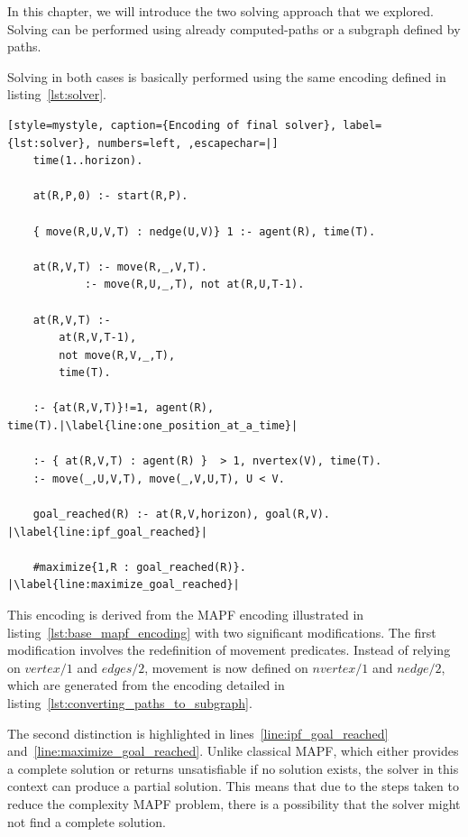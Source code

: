 In this chapter, we will introduce the two solving approach that we explored. Solving can be performed using already computed-paths or a subgraph defined by paths.

Solving in both cases is basically performed using the same encoding defined in listing~\ref{lst:solver}.

\begin{minipage}[H]{\linewidth}
\begin{lstlisting}[style=mystyle, caption={Encoding of final solver}, label={lst:solver}, numbers=left, ,escapechar=|]
    time(1..horizon).

    at(R,P,0) :- start(R,P).

    { move(R,U,V,T) : nedge(U,V)} 1 :- agent(R), time(T).

    at(R,V,T) :- move(R,_,V,T).
            :- move(R,U,_,T), not at(R,U,T-1).

    at(R,V,T) :- 
        at(R,V,T-1), 
        not move(R,V,_,T), 
        time(T).

    :- {at(R,V,T)}!=1, agent(R), time(T).|\label{line:one_position_at_a_time}|

    :- { at(R,V,T) : agent(R) }  > 1, nvertex(V), time(T).
    :- move(_,U,V,T), move(_,V,U,T), U < V.

    goal_reached(R) :- at(R,V,horizon), goal(R,V). |\label{line:ipf_goal_reached}|

    #maximize{1,R : goal_reached(R)}. |\label{line:maximize_goal_reached}|
\end{lstlisting}
\end{minipage}


This encoding is derived from the MAPF encoding illustrated in listing~\ref{lst:base_mapf_encoding} with two significant modifications. The first modification involves the redefinition of movement predicates. Instead of relying on \(vertex/1\) and \(edges/2\), movement is now defined on \(nvertex/1\) and \(nedge/2\), which are generated from the encoding detailed in listing~\ref{lst:converting_paths_to_subgraph}.

The second distinction is highlighted in lines~\ref{line:ipf_goal_reached} and~\ref{line:maximize_goal_reached}. Unlike classical MAPF, which either provides a complete solution or returns unsatisfiable if no solution exists, the solver in this context can produce a partial solution. This means that due to the steps taken to reduce the complexity MAPF problem, there is a possibility that the solver might not find a complete solution.



